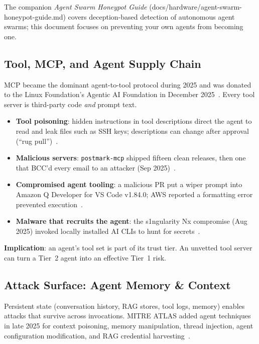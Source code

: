 \documentclass[11pt,letterpaper]{article}
\begin{document}
The companion \emph{Agent Swarm Honeypot Guide} (docs/hardware/agent-swarm-honeypot-guide.md) covers deception-based detection of autonomous agent swarms; this document focuses on preventing your own agents from becoming one.

\subsection{Tool, MCP, and Agent Supply Chain}
\label{sec:supply}

MCP became the dominant agent-to-tool protocol during 2025 and was donated to the Linux Foundation's Agentic AI Foundation in December 2025~\cite{aaif}. Every tool server is third-party code \emph{and} prompt text.

\begin{securitybox}
\begin{itemize}
  \item \textbf{Tool poisoning}: hidden instructions in tool descriptions direct the agent to read and leak files such as SSH keys; descriptions can change after approval (``rug pull'')~\cite{invariant}.
  \item \textbf{Malicious servers}: \texttt{postmark-mcp} shipped fifteen clean releases, then one that BCC'd every email to an attacker (Sep 2025)~\cite{postmark}.
  \item \textbf{Compromised agent tooling}: a malicious PR put a wiper prompt into Amazon Q Developer for VS Code v1.84.0; AWS reported a formatting error prevented execution~\cite{amazonq}.
  \item \textbf{Malware that recruits the agent}: the s1ngularity Nx compromise (Aug 2025) invoked locally installed AI CLIs to hunt for secrets~\cite{nx}.
\end{itemize}
\textbf{Implication}: an agent's tool set is part of its trust tier. An unvetted tool server can turn a Tier~2 agent into an effective Tier~1 risk.
\end{securitybox}

\subsection{Attack Surface: Agent Memory \& Context}

Persistent state (conversation history, RAG stores, tool logs, memory) enables attacks that survive across invocations. MITRE ATLAS added agent techniques in late 2025 for context poisoning, memory manipulation, thread injection, agent configuration modification, and RAG credential harvesting~\cite{atlas}.
\end{document}
